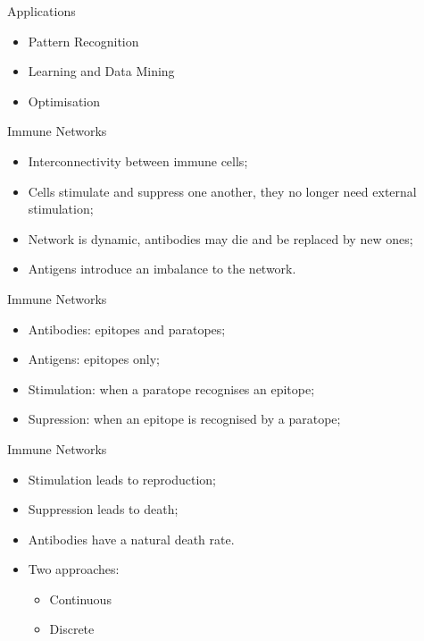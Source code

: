 \documentclass[xcolor=svgnames]{beamer}
\begin{document}
    \begin{frame}{Applications}
        \begin{itemize}
            \item Pattern Recognition
            \item Learning and Data Mining
            \item Optimisation
        \end{itemize}
    \end{frame}

    \begin{frame}{Immune Networks}
        \begin{itemize}
            \item Interconnectivity between immune cells;
            \item Cells stimulate and suppress one another, they no longer need external stimulation;
            \item Network is dynamic, antibodies may die and be replaced by new ones;
            \item Antigens introduce an imbalance to the network.
        \end{itemize}
    \end{frame}
    
    \begin{frame}{Immune Networks}
        \begin{itemize}
            \item Antibodies: epitopes and paratopes;
            \item Antigens: epitopes only;
            \item Stimulation: when a paratope recognises an epitope;
            \item Supression: when an epitope is recognised by a paratope;
        \end{itemize}
    \end{frame}
    
    \begin{frame}{Immune Networks}
        \begin{itemize}
            \item Stimulation leads to reproduction;
            \item Suppression leads to death;
            \item Antibodies have a natural death rate.
            \item Two approaches:
            \begin{itemize}
                \item Continuous
                \item Discrete
            \end{itemize}
        \end{itemize}
    \end{frame}
    
\end{document}
